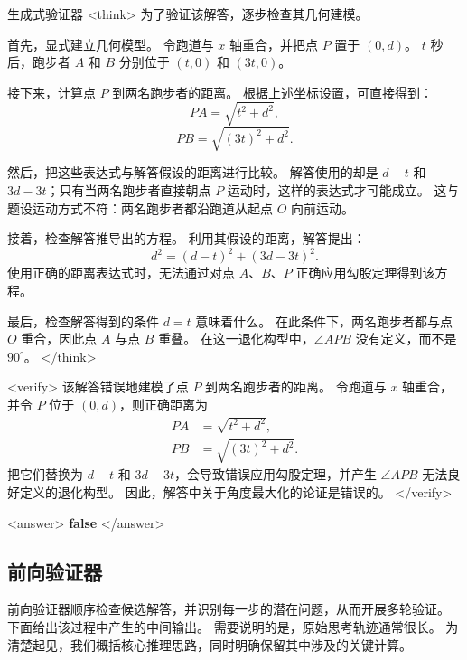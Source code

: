 \documentclass[11pt]{article}
\begin{document}
\begin{exbox}{生成式验证器}
<think>
为了验证该解答，逐步检查其几何建模。

首先，显式建立几何模型。
令跑道与 $x$ 轴重合，并把点 $P$ 置于 $(0,d)$。
$t$ 秒后，跑步者 $A$ 和 $B$ 分别位于 $(t,0)$ 和 $(3t,0)$。

接下来，计算点 $P$ 到两名跑步者的距离。
根据上述坐标设置，可直接得到：
\[
PA = \sqrt{t^2 + d^2},
\]
\[
PB = \sqrt{(3t)^2 + d^2}.
\]

然后，把这些表达式与解答假设的距离进行比较。
解答使用的却是 $d-t$ 和 $3d-3t$；只有当两名跑步者直接朝点 $P$ 运动时，这样的表达式才可能成立。
这与题设运动方式不符：两名跑步者都沿跑道从起点 $O$ 向前运动。

接着，检查解答推导出的方程。
利用其假设的距离，解答提出：
\[
d^2 = (d - t)^2 + (3d - 3t)^2.
\]
使用正确的距离表达式时，无法通过对点 $A$、$B$、$P$ 正确应用勾股定理得到该方程。

最后，检查解答得到的条件 $d=t$ 意味着什么。
在此条件下，两名跑步者都与点 $O$ 重合，因此点 $A$ 与点 $B$ 重叠。
在这一退化构型中，$\angle APB$ 没有定义，而不是 $90^\circ$。
</think>

<verify>
该解答错误地建模了点 $P$ 到两名跑步者的距离。
令跑道与 $x$ 轴重合，并令 $P$ 位于 $(0,d)$，则正确距离为
\[
\begin{aligned}
PA &= \sqrt{t^2 + d^2}, \\
PB &= \sqrt{(3t)^2 + d^2}.
\end{aligned}
\]
把它们替换为 $d-t$ 和 $3d-3t$，会导致错误应用勾股定理，并产生 $\angle APB$ 无法良好定义的退化构型。
因此，解答中关于角度最大化的论证是错误的。
</verify>

<answer>
\textbf{false}
</answer>
\end{exbox}

\subsection{前向验证器}

前向验证器顺序检查候选解答，并识别每一步的潜在问题，从而开展多轮验证。
下面给出该过程中产生的中间输出。
需要说明的是，原始思考轨迹通常很长。
为清楚起见，我们概括核心推理思路，同时明确保留其中涉及的关键计算。
\end{document}

